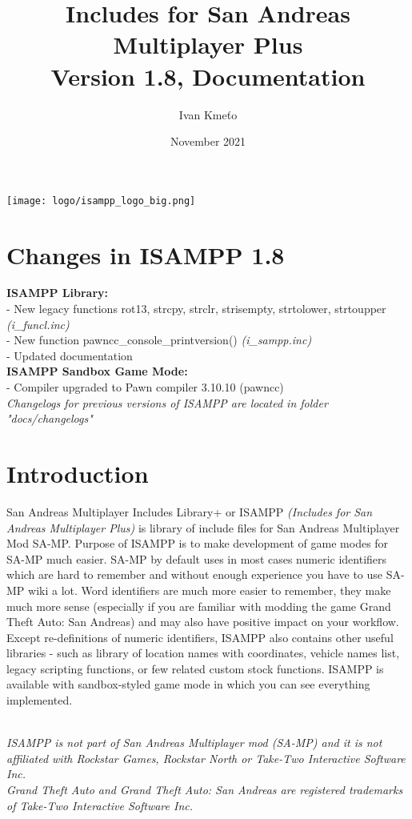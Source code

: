 \documentclass{article}
\title{Includes for San Andreas Multiplayer Plus\\Version 1.8, Documentation}
\author{Ivan Kmeťo}
\date{November 2021}
\begin{document}
\maketitle
\begin{center}
\texttt{[image: logo/isampp\_logo\_big.png]}
\end{center}

\newpage
\tableofcontents

\newpage
\section{Changes in ISAMPP 1.8}
\textbf{ISAMPP Library:}
\\- New legacy functions rot13, strcpy, strclr, strisempty, strtolower, strtoupper \textit{(i\_funcl.inc)}
\\- New function pawncc\_console\_printversion() \textit{(i\_sampp.inc)}
\\- Updated documentation
\bigskip
\\\textbf{ISAMPP Sandbox Game Mode:}
\\- Compiler upgraded to Pawn compiler 3.10.10 (pawncc) 
\bigskip
\\\textit{Changelogs for previous versions of ISAMPP are located in folder "docs/changelogs"}

\newpage
\section{Introduction}
San Andreas Multiplayer Includes Library+ or ISAMPP \textit{(Includes for San Andreas Multiplayer Plus)} is library of include files for San Andreas Multiplayer Mod SA-MP. Purpose of ISAMPP is to make development of game modes for SA-MP much easier. SA-MP by default uses in most cases numeric identifiers which are hard to remember and without enough experience you have to use SA-MP wiki a lot. Word identifiers are much more easier to remember, they make much more sense (especially if you are familiar with modding the game Grand Theft Auto: San Andreas) and may also have positive impact on your workflow. Except re-definitions of numeric identifiers, ISAMPP also contains other useful libraries - such as library of location names with coordinates, vehicle names list, legacy scripting functions, or few related custom stock functions. ISAMPP is available with sandbox-styled game mode in which you can see everything implemented.

\textit{\\ISAMPP is not part of San Andreas Multiplayer mod (SA-MP) and it is not affiliated with Rockstar Games, Rockstar North or Take-Two Interactive Software Inc.}
\textit{\\Grand Theft Auto and Grand Theft Auto: San Andreas are registered trademarks of Take-Two Interactive Software Inc.}
\end{document}
